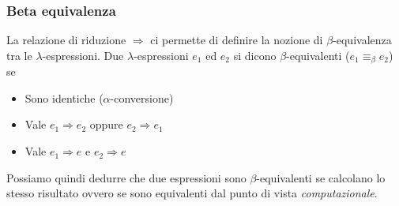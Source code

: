 \subsubsection{Beta equivalenza}
La relazione di riduzione $\Rightarrow$ ci permette di definire la nozione di $\beta$-equivalenza tra le
$\lambda$-espressioni. Due $\lambda$-espressioni $e_1$ ed $e_2$ si dicono $\beta$-equivalenti
($e_1 \equiv_\beta e_2$) se
\begin{itemize}
	\item Sono identiche ($\alpha$-conversione)
	\item Vale $e_1 \Rightarrow e_2$ oppure $e_2 \Rightarrow e_1$
	\item Vale $e_1 \Rightarrow e$ e $e_2 \Rightarrow e$
\end{itemize}
Possiamo quindi dedurre che due espressioni sono $\beta$-equivalenti se calcolano lo stesso risultato ovvero se
sono equivalenti dal punto di vista \emph{computazionale}.